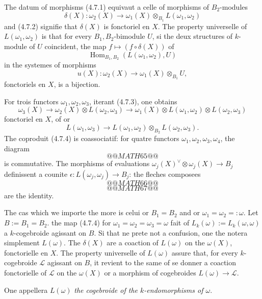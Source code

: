 \documentclass[12pt,a4paper]{article}
\theoremstyle{plain}
\theoremstyle{definition}
\theoremstyle{remark}
\DeclareMathOperator{\Hom}{Hom}
\begin{document}
The datum of morphisms (4.7.1) equivaut a celle of morphisms of $B_2$-modules
\begin{equation}\label{eq:4.7.3}
\delta(X) : \omega_2(X) \to \omega_1(X) \otimes_{B_1} L(\omega_1,\omega_2)
\end{equation}
and (4.7.2) signifie that $\delta(X)$ is fonctoriel en $X$. The property universelle of $L(\omega_1,\omega_2)$ is that for every $B_1,B_2$-bimodule $U$, si the deux structures of $k$-module of $U$ coincident, the map $f \mapsto (f \circ \delta(X))$ of
\[
\Hom_{B_1,B_2}(L(\omega_1,\omega_2), U)
\]
in the systemes of morphisms
\[
u(X) : \omega_2(X) \to \omega_1(X) \otimes_{B_1} U,
\]
fonctoriels en $X$, is a bijection.

For trois functors $\omega_1, \omega_2, \omega_3$, iterant (4.7.3), one obtains
\[
\omega_3(X) \to \omega_2(X) \otimes L(\omega_2,\omega_3) \to \omega_1(X) \otimes L(\omega_1,\omega_2) \otimes L(\omega_2,\omega_3)
\]
fonctoriel en $X$, of or
\begin{equation}\label{eq:4.7.4}
L(\omega_1,\omega_3) \to L(\omega_1,\omega_2) \otimes_{B_2} L(\omega_2,\omega_3).
\end{equation}
The coproduit (4.7.4) is coassociatif: for quatre functors $\omega_1, \omega_2, \omega_3, \omega_4$, the diagram
\[
@@MATH65@@
\]
is commutative. The morphisms of evaluations $\omega_j(X)^\vee \otimes \omega_j(X) \to B_j$ definissent a counite $\epsilon : L(\omega_j,\omega_j) \to B_j$: the fleches composees
\[
@@MATH66@@
\]
\[
@@MATH67@@
\]
are the identity.

The cas which we importe the more is celui or $B_1 = B_2$ and or $\omega_1 = \omega_2 =: \omega$.
Let $B := B_1 = B_2$. the map (4.7.4) for $\omega_1 = \omega_2 = \omega_3 = \omega$ fait of $L_k(\omega) := L_k(\omega,\omega)$ a $k$-cogebroide agissant on $B$. Si that ne prete not a confusion, one the notera simplement $L(\omega)$. The $\delta(X)$ are a coaction of $L(\omega)$ on the $\omega(X)$, fonctorielle en $X$. The property universelle of $L(\omega)$ assure that, for every $k$-cogebroide $\mathcal{L}$ agissant on $B$, it revient to the same of se donner a coaction fonctorielle of $\mathcal{L}$ on the $\omega(X)$ or a morphism of cogebroides $L(\omega) \to \mathcal{L}$.

One appellera $L(\omega)$ \emph{the cogebroide of the $k$-endomorphisms of $\omega$}.
\end{document}
